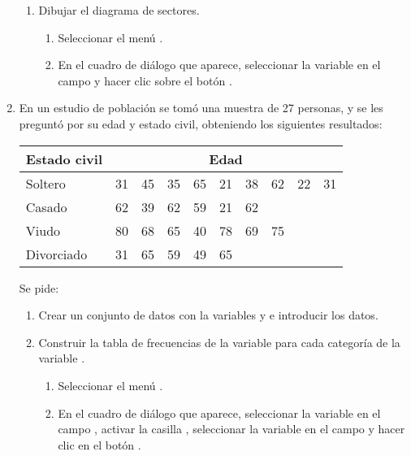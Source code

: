 \begin{enumerate}[leftmargin=*]
\begin{enumerate}
\item Dibujar el diagrama de sectores.
\begin{indicacion}{
\begin{enumerate}
\item Seleccionar el menú .
\item En el cuadro de diálogo que aparece, seleccionar la variable  en el campo
 y hacer clic sobre el botón .
\end{enumerate}}
\end{indicacion}
\end{enumerate}

\item  En un estudio de población se tomó una muestra de 27 personas, y se les preguntó por su edad y estado civil,
obteniendo los siguientes resultados:
\begin{center}
\begin{tabular}{|l|rrrrrrrrr|}
\hline
Estado civil & \multicolumn{9}{c|}{Edad}\\
\hline
Soltero    & 31 & 45 & 35 & 65 & 21 & 38 & 62 & 22 & 31 \\
Casado     & 62 & 39 & 62 & 59 & 21 & 62 &    &    &    \\
Viudo      & 80 & 68 & 65 & 40 & 78 & 69 & 75 &    &    \\
Divorciado & 31 & 65 & 59 & 49 & 65 &    &    &    &    \\
\hline
\end{tabular}
\end{center}

Se pide:
\begin{enumerate}
\item Crear un conjunto de datos con la variables  y  e introducir los datos.
\item Construir la tabla de frecuencias de la variable  para cada categoría de la
variable .
\begin{indicacion}{
\begin{enumerate}
\item Seleccionar el menú .
\item En el cuadro de diálogo que aparece, seleccionar la variable  en el campo , activar la casilla , seleccionar la variable  en el campo
 y hacer clic en el botón .
\end{enumerate}}
\end{indicacion}


\end{enumerate}
\end{enumerate}
